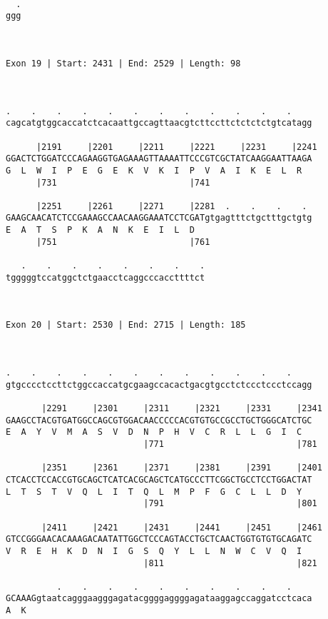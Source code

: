\documentclass{article}
\begin{document}
{\begin{Verbatim}
  
  .
ggg
   
   
 
Exon 19 | Start: 2431 | End: 2529 | Length: 98



.    .    .    .    .    .    .    .    .    .    .    .    
cagcatgtggcaccatctcacaattgccagttaacgtcttccttctctctctgtcatagg
                                                            
      |2191     |2201     |2211     |2221     |2231     |2241
GGACTCTGGATCCCAGAAGGTGAGAAAGTTAAAATTCCCGTCGCTATCAAGGAATTAAGA
G  L  W  I  P  E  G  E  K  V  K  I  P  V  A  I  K  E  L  R  
      |731                          |741                    
  
      |2251     |2261     |2271     |2281  .    .    .    . 
GAAGCAACATCTCCGAAAGCCAACAAGGAAATCCTCGATgtgagtttctgctttgctgtg
E  A  T  S  P  K  A  N  K  E  I  L  D                       
      |751                          |761                    
  
   .    .    .    .    .    .    .    .
tgggggtccatggctctgaacctcaggcccaccttttct
                                       
                                       
 
Exon 20 | Start: 2530 | End: 2715 | Length: 185



.    .    .    .    .    .    .    .    .    .    .    .    
gtgcccctccttctggccaccatgcgaagccacactgacgtgcctctccctccctccagg
                                                            
       |2291     |2301     |2311     |2321     |2331     |2341
GAAGCCTACGTGATGGCCAGCGTGGACAACCCCCACGTGTGCCGCCTGCTGGGCATCTGC
E  A  Y  V  M  A  S  V  D  N  P  H  V  C  R  L  L  G  I  C  
                           |771                          |781
  
       |2351     |2361     |2371     |2381     |2391     |2401
CTCACCTCCACCGTGCAGCTCATCACGCAGCTCATGCCCTTCGGCTGCCTCCTGGACTAT
L  T  S  T  V  Q  L  I  T  Q  L  M  P  F  G  C  L  L  D  Y  
                           |791                          |801
  
       |2411     |2421     |2431     |2441     |2451     |2461
GTCCGGGAACACAAAGACAATATTGGCTCCCAGTACCTGCTCAACTGGTGTGTGCAGATC
V  R  E  H  K  D  N  I  G  S  Q  Y  L  L  N  W  C  V  Q  I  
                           |811                          |821
  
          .    .    .    .    .    .    .    .    .    .    
GCAAAGgtaatcagggaagggagatacggggaggggagataaggagccaggatcctcaca
A  K                                                        
                                                            

\end{Verbatim}}
\end{document}
